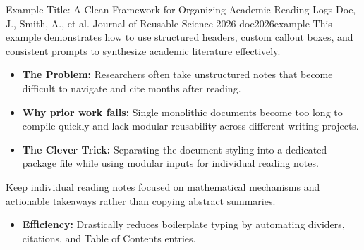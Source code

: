 \begin{paperbox}
    {Example Title: A Clean Framework for Organizing Academic Reading Logs}
    {Doe, J., Smith, A., et al.}
    {Journal of Reusable Science 2026}
    {doe2026example}
    This example demonstrates how to use structured headers, custom callout boxes, and consistent prompts to synthesize academic literature effectively.
\end{paperbox}



\loggap
\begin{itemize}
    \item \textbf{The Problem:} Researchers often take unstructured notes that become difficult to navigate and cite months after reading.
    \item \textbf{Why prior work fails:} Single monolithic documents become too long to compile quickly and lack modular reusability across different writing projects.
\end{itemize}



\logmethod
\begin{itemize}
    \item \textbf{The Clever Trick:} Separating the document styling into a dedicated package file while using modular inputs for individual reading notes.
\end{itemize}

\begin{insightbox}
    Keep individual reading notes focused on mathematical mechanisms and actionable takeaways rather than copying abstract summaries.
\end{insightbox}



\logresults
\begin{itemize}
    \item \textbf{Efficiency:} Drastically reduces boilerplate typing by automating dividers, citations, and Table of Contents entries.
\end{itemize}


